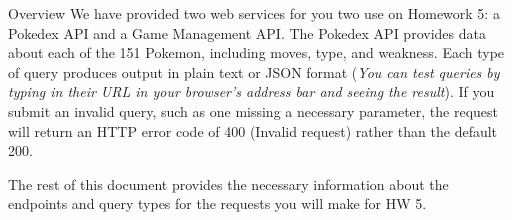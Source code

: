 \documentclass[programming]{../../../../mfcs}
\begin{document}
\vspace{-3.8em}

\hfill\begin{varwidth}{0.5\textwidth}
\end{varwidth}
\vspace{1em}

\begin{question}{Overview}
We have provided two web services for you two use on Homework 5: a Pokedex API and a Game Management
API. The Pokedex API provides data about each of the 151 Pokemon, including moves, type, and
weakness. Each type of query produces output in plain text or JSON format (\emph{You can test queries by typing in their URL in your
browser's address bar and seeing the result}). If you submit an invalid query, such as one missing a
necessary parameter, the request will return an HTTP error code of 400 (Invalid request) rather than
the default 200. 
\newline

The rest of this document provides the necessary information about the endpoints and query types for
the requests you will make for HW 5.
\end{question}
\end{document}
